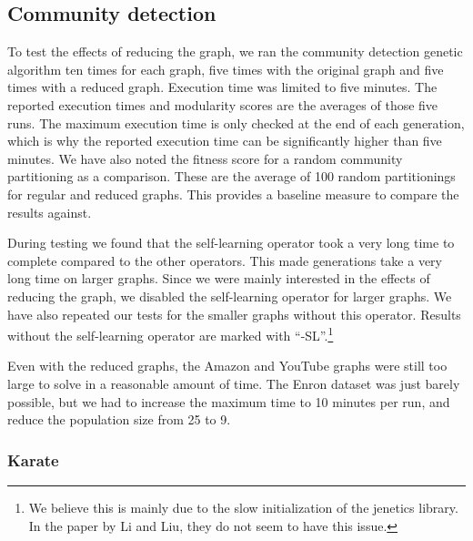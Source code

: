 \subsection{Community detection}
To test the effects of reducing the graph, we ran the community detection genetic algorithm ten times for each graph, five times with the original graph and five times with a reduced graph. Execution time was limited to five minutes. The reported execution times and modularity scores are the averages of those five runs. The maximum execution time is only checked at the end of each generation, which is why the reported execution time can be significantly higher than five minutes. We have also noted the fitness score for a random community partitioning as a comparison. These are the average of 100 random partitionings for regular and reduced graphs. This provides a baseline measure to compare the results against.
\par
During testing we found that the self-learning operator took a very long time to complete compared to the other operators. This made generations take a very long time on larger graphs. Since we were mainly interested in the effects of reducing the graph, we disabled the self-learning operator for larger graphs. We have also repeated our tests for the smaller graphs without this operator. Results without the self-learning operator are marked with ``-SL''.\footnote{We believe this is mainly due to the slow initialization of the jenetics library. In the paper by Li and Liu, they do not seem to have this issue. }
\par
Even with the reduced graphs, the Amazon and YouTube graphs were still too large to solve in a reasonable amount of time. The Enron dataset was just barely possible, but we had to increase the maximum time to 10 minutes per run, and reduce the population size from 25 to 9.

\subsubsection{Karate}

